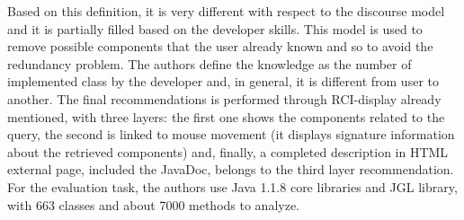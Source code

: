 Based on this definition, it is very different with respect to the discourse model and it is partially filled based on the developer skills. This model is used to remove possible components that the user already known and so to avoid the redundancy problem. The authors define the knowledge as the number of implemented class by the developer and, in general, it is different from user to another. The final recommendations is performed through RCI-display already mentioned, with three layers: the first one shows the components related to the query, the second is linked to mouse movement (it displays signature information about the retrieved components) and, finally, a completed description in HTML external page, included the JavaDoc, belongs to the third layer recommendation. For the evaluation task, the authors use Java 1.1.8 core libraries and JGL library, with 663 classes and about 7000 methods to analyze. 

